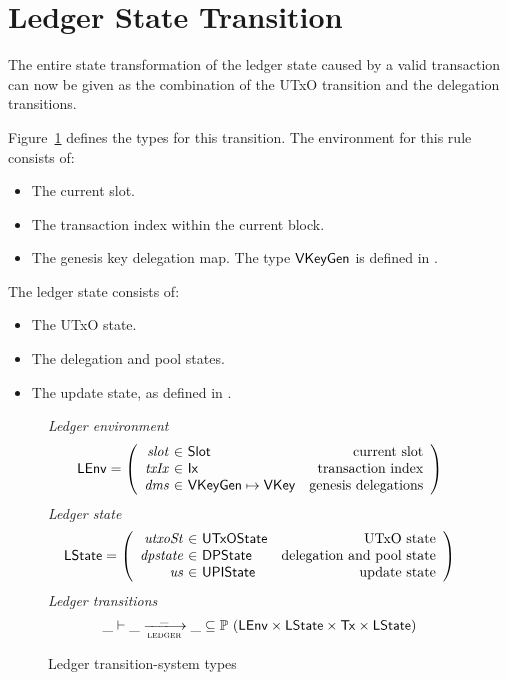 \section{Ledger State Transition}
\label{sec:ledger-trans}

The entire state transformation of the ledger state caused by a valid transaction
can now be given as the combination of the UTxO transition and the delegation transitions.

Figure~\ref{fig:ts-types:ledger} defines the types for this transition.
The environment for this rule consists of:
\begin{itemize}
  \item The current slot.
  \item The transaction index within the current block.
  \item The genesis key delegation map. The type $\mathsf{VKeyGen}$ is defined in \cite{byron_ledger_spec}.
\end{itemize}
The ledger state consists of:
\begin{itemize}
  \item The UTxO state.
  \item The delegation and pool states.
  \item The update state, as defined in \cite{byron_ledger_spec}.
\end{itemize}

\begin{figure}[htb]
  \emph{Ledger environment}
  \begin{equation*}
    \LEnv =
    \left(
      \begin{array}{r@{~\in~}lr}
        \var{slot} & \Slot & \text{current slot}\\
        \var{txIx} & \Ix & \text{transaction index}\\
        \var{dms} & \VKeyGen \mapsto \VKey & \text{genesis delegations}\\
      \end{array}
    \right)
  \end{equation*}
  \emph{Ledger state}
  \begin{equation*}
    \LState =
    \left(
      \begin{array}{r@{~\in~}lr}
        \var{utxoSt} & \UTxOState & \text{UTxO state}\\
        \var{dpstate} & \DPState & \text{delegation and pool state}\\
        \var{us} & \UPIState & \text{update state}\\
      \end{array}
    \right)
  \end{equation*}
  \emph{Ledger transitions}
  \begin{equation*}
    \_ \vdash
    \var{\_} \trans{ledger}{\_} \var{\_}
    \subseteq \powerset (\LEnv \times \LState \times \Tx \times \LState)
  \end{equation*}
  \caption{Ledger transition-system types}
  \label{fig:ts-types:ledger}
\end{figure}

